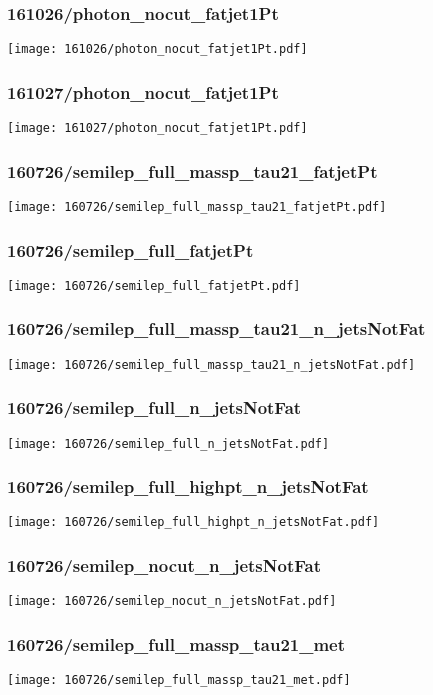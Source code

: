 \begin{frame}
   \frametitle{\small 161026/photon\_nocut\_fatjet1Pt}
   \centering
   \texttt{[image: 161026/photon\_nocut\_fatjet1Pt.pdf]}
\end{frame}

\begin{frame}
   \frametitle{\small 161027/photon\_nocut\_fatjet1Pt}
   \centering
   \texttt{[image: 161027/photon\_nocut\_fatjet1Pt.pdf]}
\end{frame}

\begin{frame}
   \frametitle{\small 160726/semilep\_full\_massp\_tau21\_fatjetPt}
   \centering
   \texttt{[image: 160726/semilep\_full\_massp\_tau21\_fatjetPt.pdf]}
\end{frame}

\begin{frame}
   \frametitle{\small 160726/semilep\_full\_fatjetPt}
   \centering
   \texttt{[image: 160726/semilep\_full\_fatjetPt.pdf]}
\end{frame}

\begin{frame}
   \frametitle{\small 160726/semilep\_full\_massp\_tau21\_n\_jetsNotFat}
   \centering
   \texttt{[image: 160726/semilep\_full\_massp\_tau21\_n\_jetsNotFat.pdf]}
\end{frame}

\begin{frame}
   \frametitle{\small 160726/semilep\_full\_n\_jetsNotFat}
   \centering
   \texttt{[image: 160726/semilep\_full\_n\_jetsNotFat.pdf]}
\end{frame}

\begin{frame}
   \frametitle{\small 160726/semilep\_full\_highpt\_n\_jetsNotFat}
   \centering
   \texttt{[image: 160726/semilep\_full\_highpt\_n\_jetsNotFat.pdf]}
\end{frame}

\begin{frame}
   \frametitle{\small 160726/semilep\_nocut\_n\_jetsNotFat}
   \centering
   \texttt{[image: 160726/semilep\_nocut\_n\_jetsNotFat.pdf]}
\end{frame}

\begin{frame}
   \frametitle{\small 160726/semilep\_full\_massp\_tau21\_met}
   \centering
   \texttt{[image: 160726/semilep\_full\_massp\_tau21\_met.pdf]}
\end{frame}

